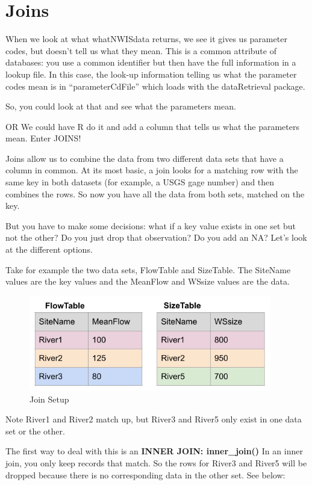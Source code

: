 \documentclass[
]{book}
\begin{document}
\hypertarget{joins}{%
\section{Joins}\label{joins}}

When we look at what whatNWISdata returns, we see it gives us parameter codes, but doesn't tell us what they mean. This is a common attribute of databases: you use a common identifier but then have the full information in a lookup file. In this case, the look-up information telling us what the parameter codes mean is in ``parameterCdFile'' which loads with the dataRetrieval package.

So, you could look at that and see what the parameters mean.

OR We could have R do it and add a column that tells us what the parameters mean. Enter JOINS!

Joins allow us to combine the data from two different data sets that have a column in common. At its most basic, a join looks for a matching row with the same key in both datasets (for example, a USGS gage number) and then combines the rows. So now you have all the data from both sets, matched on the key.

But you have to make some decisions: what if a key value exists in one set but not the other? Do you just drop that observation? Do you add an NA? Let's look at the different options.

Take for example the two data sets, FlowTable and SizeTable. The SiteName values are the key values and the MeanFlow and WSsize values are the data.

\begin{figure}
\centering
\includegraphics[width=4.16667in,height=\textheight]{images/joinsetup.png}
\caption{Join Setup}
\end{figure}

Note River1 and River2 match up, but River3 and River5 only exist in one data set or the other.

The first way to deal with this is an \textbf{INNER JOIN: inner\_join()} In an inner join, you only keep records that match. So the rows for River3 and River5 will be dropped because there is no corresponding data in the other set. See below:
\end{document}
